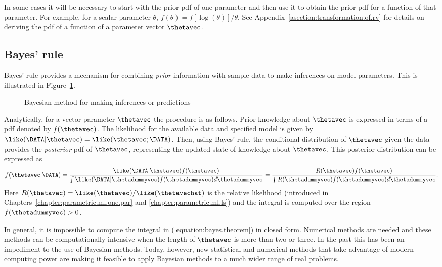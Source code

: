 In some cases it will be necessary to start with the prior
pdf of one parameter and then use it to obtain the prior pdf for
a function of that parameter. For example, for a scalar parameter
$\theta$, $f(\theta) = f[\log(\theta)]/\theta$. See
Appendix~\ref{asection:transformation.of.rv} for details on
deriving the pdf of a function of a parameter vector $\thetavec$.

\subsection{Bayes' rule}
Bayes' rule provides a mechanism for combining {\em prior} information
with sample data to make inferences on model parameters.
This is illustrated in Figure~\ref{figure:bayesfig.ps}.
\begin{figure}
\caption{Bayesian method for making inferences or predictions}
\label{figure:bayesfig.ps}
\end{figure}
Analytically, for a vector parameter $\thetavec$ the procedure is as
follows.  Prior knowledge about $\thetavec$ is expressed in terms of a
pdf denoted by $f(\thetavec)$.  The likelihood for the available data
and specified model is given by $\like(\DATA | \thetavec ) =
\like(\thetavec;
\DATA)$.  Then, using Bayes' rule, the conditional distribution of
$\thetavec$ given the data provides the {\em posterior} pdf
of $\thetavec$, representing the updated state of knowledge about
$\thetavec$. This posterior distribution can be expressed as
\begin{equation}
\label{equation:bayes.theorem}
f(\thetavec | \DATA)=
\frac{\like(\DATA | \thetavec ) f(\thetavec) }
     { \int \like(\DATA | \thetadummyvec ) f(\thetadummyvec) d \thetadummyvec}
=
\frac{R(\thetavec) f(\thetavec) }
     { \int R(\thetadummyvec) f(\thetadummyvec) d \thetadummyvec}.
\end{equation}
Here $R(\thetavec)=\like(\thetavec)/\like(\thetavechat)$ is the
relative likelihood (introduced in
Chapters~\ref{chapter:parametric.ml.one.par} and
\ref{chapter:parametric.ml.ls}) and
the integral is computed over the region $f(\thetadummyvec) > 0$.

In general, it is impossible to compute the integral in
(\ref{equation:bayes.theorem}) in closed form.  Numerical methods are
needed and these methods can be computationally intensive when the
length of $\thetavec$ is more than two or three. In the past this has
been an impediment to the use of Bayesian methods. Today, however, new
statistical and numerical methods that take advantage of modern
computing power are making it feasible to apply Bayesian methods to a
much wider range of real problems.

